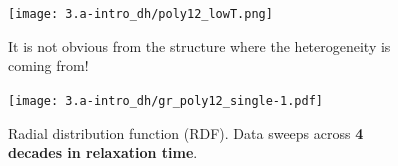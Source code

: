 \begin{frame}[c]
\begin{columns}
\begin{column}{0.5\textwidth}
\end{column}

\begin{column}{0.5\textwidth}
\centering  {}


\begin{figure}[t]
\begin{overprint}
\centering\texttt{[image: 3.a-intro\_dh/poly12\_lowT.png]}\caption{It is not obvious from the structure where the heterogeneity is coming from!}
\centering\texttt{[image: 3.a-intro\_dh/gr\_poly12\_single-1.pdf]}
\caption{Radial distribution function (RDF). Data sweeps across \textbf{4 decades in relaxation time}.}

\end{overprint}

\end{figure}



\end{column}
\end{columns}
\end{frame} 
